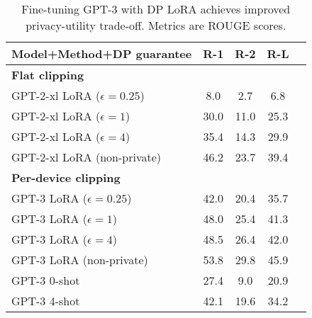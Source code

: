 \begin{table}[ht]
\centering
\caption{Fine-tuning GPT-3 with DP LoRA achieves improved privacy-utility trade-off. Metrics are ROUGE scores.}
\begin{tabular}{l c ccc}\\
\toprule
Model+Method+DP guarantee & R-1 & R-2 & R-L \\
\midrule
\textbf{Flat clipping} & & & \\
\hspace{1mm} GPT-2-xl LoRA ($\epsilon= 0.25$) & 8.0 & 2.7 & 6.8 \\
\hspace{1mm} GPT-2-xl LoRA ($\epsilon=1$)     & 30.0 & 11.0 & 25.3 \\
\hspace{1mm} GPT-2-xl LoRA ($\epsilon=4$)     & 35.4 & 14.3 & 29.9 \\
GPT-2-xl LoRA (non-private)     & 46.2 & 23.7 & 39.4 \\
\midrule
\textbf{Per-device clipping} & & & \\
\hspace{1mm} GPT-3 LoRA ($\epsilon= 0.25$) & 42.0 & 20.4 & 35.7 \\
\hspace{1mm} GPT-3 LoRA ($\epsilon= 1$)    & 48.0 & 25.4 & 41.3 \\
\hspace{1mm} GPT-3 LoRA ($\epsilon= 4$)    & 48.5 & 26.4 & 42.0 \\
GPT-3 LoRA (non-private) & 53.8 & 29.8 & 45.9 \\

\midrule
GPT-3 0-shot             & 27.4 & 9.0 & 20.9 \\
GPT-3 4-shot             & 42.1 & 19.6 & 34.2 \\

\bottomrule
\end{tabular}
\label{table:gpt3_trimmed}
\end{table}
